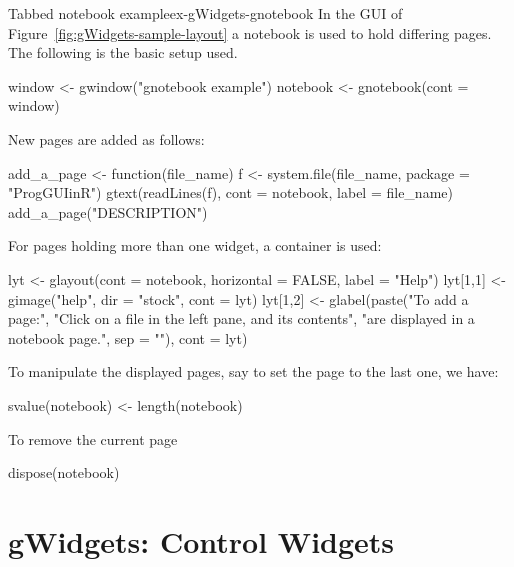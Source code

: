 \begin{example}{Tabbed notebook example}{ex-gWidgets-gnotebook}
 In the GUI of Figure~\ref{fig:gWidgets-sample-layout} a notebook is
 used to hold differing pages. The following is the basic setup used.
\begin{Schunk}
\begin{Sinput}
 window <- gwindow("gnotebook example")
 notebook <- gnotebook(cont = window)
\end{Sinput}
\end{Schunk}

New pages are added as follows:
\begin{Schunk}
\begin{Sinput}
 add_a_page <- function(file_name) {
   f <- system.file(file_name, package = "ProgGUIinR")
   gtext(readLines(f), cont = notebook, label = file_name)
 }
 add_a_page("DESCRIPTION")
\end{Sinput}
\end{Schunk}

For pages holding more than one widget, a container is used:
\begin{Schunk}
\begin{Sinput}
 lyt <- glayout(cont = notebook, horizontal = FALSE, 
                label = "Help")
 lyt[1,1] <- gimage("help", dir = "stock", cont = lyt)
 lyt[1,2] <- glabel(paste("To add a page:",
            "Click on a file in the left pane, and its contents",
            "are displayed in a notebook page.", sep = "\n"), 
            cont = lyt)
\end{Sinput}
\end{Schunk}


To manipulate the displayed pages, say to set the page to the last one,
we have:
\begin{Schunk}
\begin{Sinput}
 svalue(notebook) <- length(notebook)
\end{Sinput}
\end{Schunk}
%
To remove the current page
\begin{Schunk}
\begin{Sinput}
 dispose(notebook)
\end{Sinput}
\end{Schunk}
%
\end{example}






\chapter{gWidgets: Control Widgets}
\label{cha:control-widgets}

